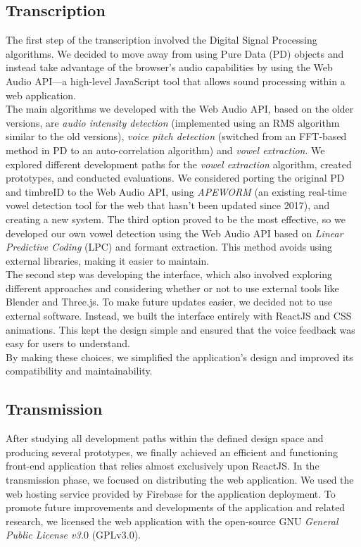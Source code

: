 \subsection*{Transcription}
The first step of the transcription involved the Digital Signal Processing algorithms. We decided to move away from using Pure Data (PD) objects and instead take advantage of the browser’s audio capabilities by using the Web Audio API—a high-level JavaScript tool that allows sound processing within a web application.\\
The main algorithms we developed with the Web Audio API, based on the older versions, are \textit{audio intensity detection} (implemented using an RMS algorithm similar to the old versions), \textit{voice pitch detection} (switched from an FFT-based method in PD to an auto-correlation algorithm) and \textit{vowel extraction}. We explored different development paths for the \textit{vowel extraction} algorithm, created prototypes, and conducted evaluations. We considered porting the original PD and timbreID to the Web Audio API, using \textit{APEWORM} (an existing real-time vowel detection tool for the web that hasn’t been updated since 2017), and creating a new system. The third option proved to be the most effective, so we developed our own vowel detection using the Web Audio API based on \textit{Linear Predictive Coding} (LPC) and formant extraction. This method avoids using external libraries, making it easier to maintain.\\
The second step was developing the interface, which also involved exploring different approaches and considering whether or not to use external tools like Blender and Three.js. To make future updates easier, we decided not to use external software. Instead, we built the interface entirely with ReactJS and CSS animations. This kept the design simple and ensured that the voice feedback was easy for users to understand.\\
By making these choices, we simplified the application’s design and improved its compatibility and maintainability.

\subsection*{Transmission}
After studying all development paths within the defined design space and producing several prototypes, we finally achieved an efficient and functioning front-end application that relies almost exclusively upon ReactJS. In the transmission phase, we focused on distributing the web application. We used the web hosting service provided by Firebase for the application deployment. To promote future improvements and developments of the application and related research, we licensed the web application with the open-source GNU \textit{General Public License v3.}0 (GPLv3.0).

